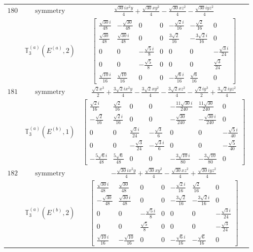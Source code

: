\documentclass[fleqn,8pt,landscape]{jsarticle}
\begin{document}
\begin{longtable}{ccc}
$ 180 $ & $ \text{symmetry} $ & $ \frac{\sqrt{30} i x^{2} y}{4} + \frac{\sqrt{30} x y^{2}}{4} - \frac{\sqrt{30} x z^{2}}{4} - \frac{\sqrt{30} i y z^{2}}{4} $ \\
$  $ & $ \mathbb{T}_{3}^{(a)}(E^{(a)},2) $ & $ \begin{bmatrix} \frac{\sqrt{30} i}{48} & - \frac{\sqrt{30}}{48} & 0 & 0 & - \frac{\sqrt{2} i}{16} & - \frac{\sqrt{2}}{16} & 0 \\ \frac{\sqrt{30}}{48} & \frac{\sqrt{30} i}{48} & 0 & 0 & \frac{3 \sqrt{2}}{16} & - \frac{3 \sqrt{2} i}{16} & 0 \\ 0 & 0 & - \frac{\sqrt{5} i}{8} & 0 & 0 & 0 & - \frac{\sqrt{3} i}{24} \\ 0 & 0 & - \frac{\sqrt{5}}{8} & 0 & 0 & 0 & \frac{\sqrt{3}}{24} \\ \frac{\sqrt{10} i}{16} & \frac{\sqrt{10}}{16} & 0 & 0 & - \frac{\sqrt{6} i}{16} & \frac{\sqrt{6}}{16} & 0 \end{bmatrix} $ \\ \hline
$ 181 $ & $ \text{symmetry} $ & $ \frac{\sqrt{2} x^{3}}{2} + \frac{3 \sqrt{2} i x^{2} y}{4} - \frac{3 \sqrt{2} x y^{2}}{4} - \frac{3 \sqrt{2} x z^{2}}{4} - \frac{\sqrt{2} i y^{3}}{2} + \frac{3 \sqrt{2} i y z^{2}}{4} $ \\
$  $ & $ \mathbb{T}_{3}^{(a)}(E^{(b)},1) $ & $ \begin{bmatrix} \frac{\sqrt{2} i}{16} & \frac{\sqrt{2}}{16} & 0 & 0 & - \frac{11 \sqrt{30} i}{240} & \frac{11 \sqrt{30}}{240} & 0 \\ - \frac{\sqrt{2}}{16} & \frac{\sqrt{2} i}{16} & 0 & 0 & - \frac{\sqrt{30}}{240} & - \frac{\sqrt{30} i}{240} & 0 \\ 0 & 0 & \frac{\sqrt{3} i}{24} & - \frac{\sqrt{3}}{6} & 0 & 0 & - \frac{\sqrt{5} i}{40} \\ 0 & 0 & - \frac{\sqrt{3}}{24} & - \frac{\sqrt{3} i}{6} & 0 & 0 & - \frac{\sqrt{5}}{40} \\ - \frac{5 \sqrt{6} i}{48} & \frac{5 \sqrt{6}}{48} & 0 & 0 & - \frac{3 \sqrt{10} i}{80} & - \frac{3 \sqrt{10}}{80} & 0 \end{bmatrix} $ \\ \hline
$ 182 $ & $ \text{symmetry} $ & $ - \frac{\sqrt{30} i x^{2} y}{4} + \frac{\sqrt{30} x y^{2}}{4} - \frac{\sqrt{30} x z^{2}}{4} + \frac{\sqrt{30} i y z^{2}}{4} $ \\
$  $ & $ \mathbb{T}_{3}^{(a)}(E^{(b)},2) $ & $ \begin{bmatrix} \frac{\sqrt{30} i}{48} & \frac{\sqrt{30}}{48} & 0 & 0 & - \frac{\sqrt{2} i}{16} & \frac{\sqrt{2}}{16} & 0 \\ - \frac{\sqrt{30}}{48} & \frac{\sqrt{30} i}{48} & 0 & 0 & - \frac{3 \sqrt{2}}{16} & - \frac{3 \sqrt{2} i}{16} & 0 \\ 0 & 0 & - \frac{\sqrt{5} i}{8} & 0 & 0 & 0 & - \frac{\sqrt{3} i}{24} \\ 0 & 0 & \frac{\sqrt{5}}{8} & 0 & 0 & 0 & - \frac{\sqrt{3}}{24} \\ \frac{\sqrt{10} i}{16} & - \frac{\sqrt{10}}{16} & 0 & 0 & - \frac{\sqrt{6} i}{16} & - \frac{\sqrt{6}}{16} & 0 \end{bmatrix} $ \\ \hline

\end{longtable}
\end{document}
